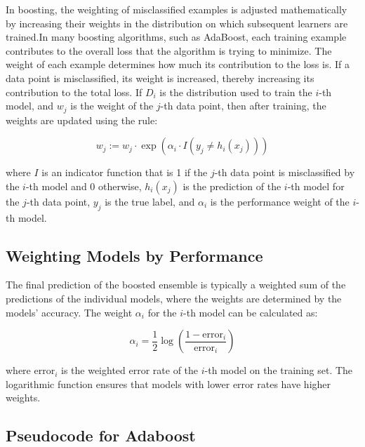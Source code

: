 \documentclass[12pt]{article}
\begin{document}
In boosting, the weighting of misclassified examples is adjusted mathematically by increasing their weights in the distribution on which subsequent learners are trained.In many boosting algorithms, such as AdaBoost, each training example contributes to the overall loss that the algorithm is trying to minimize. The weight of each example determines how much its contribution to the loss is. If a data point is misclassified, its weight is increased, thereby increasing its contribution to the total loss. If \(D_i\) is the distribution used to train the \(i\)-th model, and \(w_j\) is the weight of the \(j\)-th data point, then after training, the weights are updated using the rule:

\[ w_j := w_j \cdot \exp(\alpha_i \cdot I(y_j \neq h_i(x_j))) \]

where \(I\) is an indicator function that is 1 if the \(j\)-th data point is misclassified by the \(i\)-th model and 0 otherwise, \(h_i(x_j)\) is the prediction of the \(i\)-th model for the \(j\)-th data point, \(y_j\) is the true label, and \(\alpha_i\) is the performance weight of the \(i\)-th model.

\subsection{Weighting Models by Performance}

The final prediction of the boosted ensemble is typically a weighted sum of the predictions of the individual models, where the weights are determined by the models' accuracy. The weight \(\alpha_i\) for the \(i\)-th model can be calculated as:

\[ \alpha_i = \frac{1}{2} \log \left(\frac{1 - \text{error}_i}{\text{error}_i}\right) \]

where \(\text{error}_i\) is the weighted error rate of the \(i\)-th model on the training set. The logarithmic function ensures that models with lower error rates have higher weights.
\subsection{Pseudocode for Adaboost}
\end{document}
